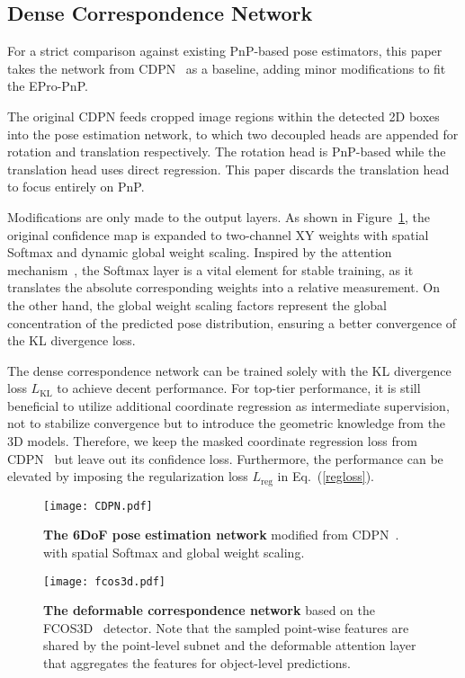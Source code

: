 \documentclass[10pt,twocolumn,letterpaper]{article}
\begin{document}
\subsection{Dense Correspondence Network} \label{densecorrnet}
For a strict comparison against existing PnP-based pose estimators, this paper takes the network from CDPN~\cite{CDPN} as a baseline, adding minor modifications to fit the EPro-PnP.

The original CDPN feeds cropped image regions within the detected 2D boxes into the pose estimation network, to which two decoupled heads are appended for rotation and translation respectively.
The rotation head is PnP-based while the translation head uses direct regression. 
This paper discards the translation head to focus entirely on PnP. 

Modifications are only made to the output layers. As shown in Figure~\ref{fig:cdpn}, the original confidence map is expanded to two-channel XY weights with spatial Softmax and dynamic global weight scaling. Inspired by the attention mechanism~\cite{vaswani2017attention}, the Softmax layer is a vital element for stable training, as it translates the absolute corresponding weights into a relative measurement. On the other hand, the global weight scaling factors represent the global concentration of the predicted pose distribution, ensuring a better convergence of the KL divergence loss.

The dense correspondence network can be trained solely with the KL divergence loss $L_\text{KL}$ to achieve decent performance. For top-tier performance, it is still beneficial to utilize additional coordinate regression as intermediate supervision, not to stabilize convergence but to introduce the geometric knowledge from the 3D models. Therefore, we keep the masked coordinate regression loss from CDPN~\cite{CDPN}
but leave out its confidence loss. Furthermore, the performance can be elevated by imposing the regularization loss $L_\text{reg}$ in Eq.~(\ref{regloss}).

\begin{figure}[t]
\begin{center}
    \texttt{[image: CDPN.pdf]}
\end{center}
\vspace{-1ex}
\caption{\textbf{The 6DoF pose estimation network} modified from CDPN~\cite{CDPN}. 
with spatial Softmax and global weight scaling.}
\label{fig:cdpn}
\end{figure}

\begin{figure*}[t]
   \begin{center}
   \texttt{[image: fcos3d.pdf]}
   \end{center}
   \vspace{-2mm}
   \caption{\textbf{The deformable correspondence network} based on the FCOS3D~\cite{fcos3d} detector. Note that the sampled point-wise features are shared by the point-level subnet and the deformable attention layer that aggregates the features for object-level predictions.} 
\label{fig:fcos3d}
\end{figure*}
\end{document}
